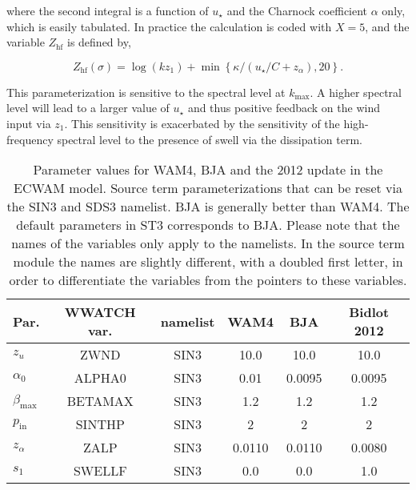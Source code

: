 \noindent
where the second integral is a function of $u_\star$ and the Charnock
coefficient $\alpha$ only, which is easily tabulated. In practice the
calculation is coded with $X=5$, and the variable $Z_{\mathrm{hf}}$ is defined
by,

\begin{equation}
Z_{\mathrm{hf}}(\sigma)=\log(k z_1)+\min\left\{\kappa/\left(u_\star/C +
z_\alpha \right),20\right\}.
\end{equation}

\noindent
This parameterization is sensitive to the spectral level at $k_{\max}$.
A higher spectral level will lead to a larger value of $u_\star$ and thus
positive feedback on the wind input via $z_1$. This sensitivity is exacerbated
by the sensitivity of the high-frequency spectral level to the presence of
swell via the dissipation term.

\begin{table}[htb]
\begin{center}
\begin{tabular}{|l|c|c|c|c|c|} \hline \hline
Par.         &  WWATCH var.           & namelist & WAM4 & BJA   & Bidlot 2012 \\
\hline
  $z_u$ &  ZWND                       & SIN3 & 10.0    & 10.0   & 10.0   \\
  $\alpha_0$ &  ALPHA0                & SIN3 & 0.01    & 0.0095 &  0.0095 \\
  $\beta_{\mathrm{max}}$ & BETAMAX    & SIN3 & 1.2     & 1.2    & 1.2  \\
  $p_{\mathrm{in}}$ &  SINTHP         & SIN3 & 2       & 2      & 2  \\
  $z_\alpha$ &  ZALP                  & SIN3 & 0.0110  & 0.0110 &  0.0080 \\
  $s_1$ &  SWELLF                     & SIN3 & 0.0     & 0.0    & 1.0   \\
\hline
\end{tabular} \end{center}
\caption{Parameter values for WAM4, BJA and the 2012 update in the ECWAM model. Source term
  parameterizations that can be reset via the {\F SIN3} and {\F SDS3} namelist. BJA is
  generally better than WAM4. The default parameters in ST3 corresponds to BJA. Please
  note that the names of the variables only apply to the namelists. In the source
  term module the names are slightly different, with a doubled first letter, in
  order to differentiate the variables from the pointers to these variables.} \label{tab:WAM4_parSIN}
\botline
\end{table}

